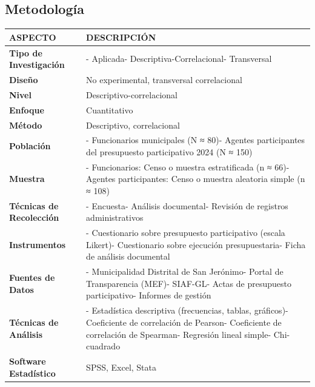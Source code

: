 \documentclass[
  man,
  floatsintext,
  longtable,
  a4paper,
  nolmodern,
  notxfonts,
  notimes,
  12pt,
  colorlinks=true,linkcolor=blue,citecolor=blue,urlcolor=blue]{apa7}
\newcounter{none} %
\begin{document}
\subsection{Metodología}\label{metodologuxeda-6}

{\def\LTcaptype{none} %
\begin{longtable}[]{@{}
  >{\raggedright\arraybackslash}p{}
  >{\raggedright\arraybackslash}p{}@{}}
\toprule\noalign{}
\begin{minipage}[b]{\linewidth}\raggedright
ASPECTO
\end{minipage} & \begin{minipage}[b]{\linewidth}\raggedright
DESCRIPCIÓN
\end{minipage} \\
\midrule\noalign{}
\endhead
\bottomrule\noalign{}
\endlastfoot
\textbf{Tipo de Investigación} & - Aplicada- Descriptiva-Correlacional-
Transversal \\
\textbf{Diseño} & No experimental, transversal correlacional \\
\textbf{Nivel} & Descriptivo-correlacional \\
\textbf{Enfoque} & Cuantitativo \\
\textbf{Método} & Descriptivo, correlacional \\
\textbf{Población} & - Funcionarios municipales (N ≈ 80)- Agentes
participantes del presupuesto participativo 2024 (N ≈ 150) \\
\textbf{Muestra} & - Funcionarios: Censo o muestra estratificada (n ≈
66)- Agentes participantes: Censo o muestra aleatoria simple (n ≈
108) \\
\textbf{Técnicas de Recolección} & - Encuesta- Análisis documental-
Revisión de registros administrativos \\
\textbf{Instrumentos} & - Cuestionario sobre presupuesto participativo
(escala Likert)- Cuestionario sobre ejecución presupuestaria- Ficha de
análisis documental \\
\textbf{Fuentes de Datos} & - Municipalidad Distrital de San Jerónimo-
Portal de Transparencia (MEF)- SIAF-GL- Actas de presupuesto
participativo- Informes de gestión \\
\textbf{Técnicas de Análisis} & - Estadística descriptiva (frecuencias,
tablas, gráficos)- Coeficiente de correlación de Pearson- Coeficiente de
correlación de Spearman- Regresión lineal simple- Chi-cuadrado \\
\textbf{Software Estadístico} & SPSS, Excel, Stata \\
\end{longtable}
}
\end{document}
